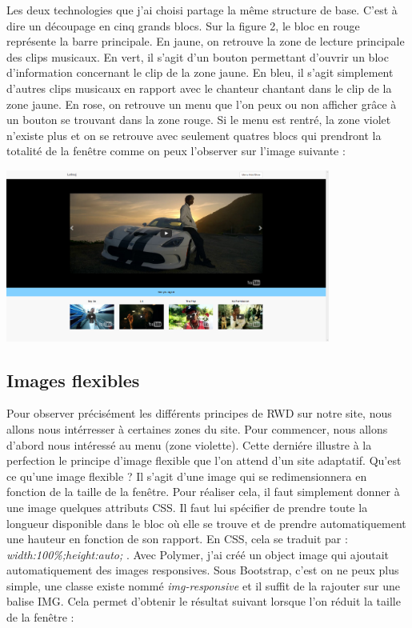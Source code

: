 \documentclass{article}
\begin{document}
Les deux technologies que j'ai choisi partage la m\^eme structure de base. C'est \`a dire un d\'ecoupage en cinq grands blocs. Sur la figure 2, le bloc en rouge repr\'esente la barre principale. En jaune, on retrouve la zone de lecture principale des clips musicaux. En vert, il s'agit d'un bouton permettant d'ouvrir un bloc d'information concernant le clip de la zone jaune. En bleu, il s'agit simplement d'autres clips musicaux en rapport avec le chanteur chantant dans le clip de la zone jaune. En rose, on retrouve un menu que l'on peux ou non afficher gr\^ace \`a un bouton se trouvant dans la zone rouge. Si le menu est rentr\'e, la zone violet n'existe plus et on se retrouve avec seulement quatres blocs qui prendront la totalit\'e de la fen\^etre comme on peux l'observer sur l'image suivante :\\

\begin{center}
  \includegraphics[width=0.8\textwidth]{p1}
\end{center}

\subsection{Images flexibles}

Pour observer pr\'ecis\'ement les diff\'erents principes de RWD sur notre site, nous allons nous int\'erresser \`a certaines zones du site. Pour commencer, nous allons d'abord nous int\'eress\'e au menu (zone violette). Cette derni\'ere illustre \`a la perfection le principe d'image flexible que l'on attend d'un site adaptatif. Qu'est ce qu'une image flexible ? Il s'agit d'une image qui se redimensionnera en fonction de la taille de la fen\^etre. Pour r\'ealiser cela, il faut simplement donner \`a une image quelques attributs CSS. Il faut lui sp\'ecifier de prendre toute la longueur disponible dans le bloc o\`u elle se trouve et de prendre automatiquement une hauteur en fonction de son rapport. En CSS, cela se traduit par : \textit{\og width:100\%;height:auto; \fg{} }. Avec Polymer, j'ai cr\'e\'e un object image qui ajoutait automatiquement des images responsives. Sous Bootstrap, c'est on ne peux plus simple, une classe existe nomm\'e \textit{\og img-responsive \fg} et il suffit de la rajouter sur une balise IMG. Cela permet d'obtenir le r\'esultat suivant lorsque l'on r\'eduit la taille de la fen\^etre :\\
\end{document}
